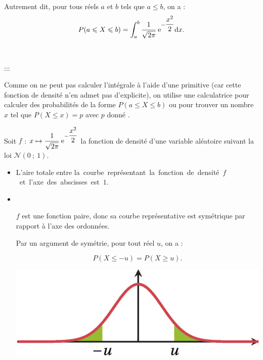 \documentclass{cornouaille}
\begin{document}
Autrement dit, pour tous réels $a$ et $b$ tels que $a\leqslant b$, on a :
\vspace{-0.5\baselineskip}$$P(a\leqslant X\leqslant b)=\displaystyle
\int_a^b \cfrac{1}{\sqrt{2\pi}}\text{ e}^{-\dfrac{x^2}{2}}\textrm{d} x.
$$

~~


:::





\begin{remarque}
Comme on ne peut pas calculer l'intégrale à l'aide d'une primitive
(car cette fonction de densité n'en admet pas d'explicite), on utilise
une calculatrice pour calculer des probabilités de la forme
$P(a\leqslant X\leqslant b)$ ou pour trouver un nombre $x$ tel que
$P(X\leqslant x)=p$ avec $p$ donné .
\end{remarque}




\begin{propriete}
Soit $f$ : $x\mapsto \cfrac{1}{\sqrt{2\pi}}\text{ e}^{-\dfrac{x^2}{2}}$ la fonction de densité d'une variable aléatoire suivant la loi $\mathcal{N}(0\ ;\ 1)$.

\begin{itemize}
\item L'aire totale entre \hbox{la courbe représentant la fonction de densité $f$ et l'axe des abscisses est $1$.}
\item ~~


\begin{minipage}{0.6\linewidth}
$f$ est une fonction paire, donc sa courbe représentative est symétrique par rapport à l'axe des ordonnées.

Par un argument de symétrie, pour tout réel $u$, on a :

$$
P(X\leqslant -u)=P(X\geqslant u).
$$
\end{minipage}

\hfill

\begin{minipage}{0.4\linewidth}



\includegraphics{./TS-Variables-5}



\end{minipage}

\end{itemize}

\end{propriete}
\end{document}
